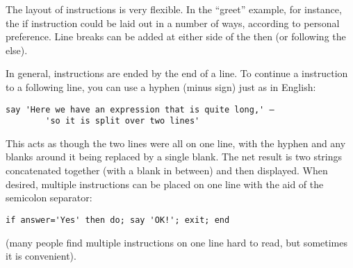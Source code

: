The layout of instructions is very flexible. In the “greet” example,
for instance, the if instruction could be laid out in a number of
ways, according to personal preference. Line breaks can be added at
either side of the then (or following the else).

In general, instructions are ended by the end of a line. To continue a
instruction to a following line, you can use a hyphen (minus sign)
just as in English:
\begin{lstlisting}[label=continue,caption=Continuation]
    say 'Here we have an expression that is quite long,' –
        'so it is split over two lines'
\end{lstlisting}
This acts as though the two lines were all on one line, with the hyphen and any blanks around it being replaced by a single blank. The net result is two strings concatenated together (with a blank in between) and then displayed.
When desired, multiple instructions can be placed on one line with the
aid of the semicolon separator:
\begin{lstlisting}[label=multiple,caption=Multiple Instructions]
    if answer='Yes' then do; say 'OK!'; exit; end
\end{lstlisting}
(many people find multiple instructions on one line hard to read, but sometimes it is convenient).
